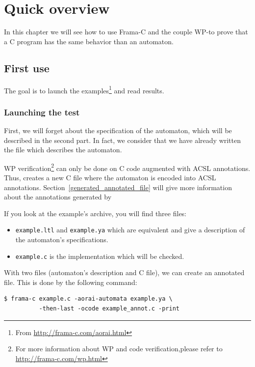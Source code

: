 \documentclass{report}
\begin{document}
\chapter{Quick overview}

In this chapter we will see how to use Frama-C and the couple
WP-\aorai to prove that a C program has the same behavior than
an automaton.

\section{First use}
\label{first_use}
  The goal is to launch the examples\footnote{ From \url{http://frama-c.com/aorai.html}} and read results.
\subsection{Launching the test}
  First, we will forget about the specification of the automaton,
  which will be described in the second part. In fact, we consider
  that we have already written the file which describes the automaton.

  WP verification\footnote{For more information about WP
    and code verification,please refer to
    \url{http://frama-c.com/wp.html}} can only be done on C
  code augmented with ACSL annotations. Thus, 
  \aorai creates a new C file where the automaton is encoded into ACSL 
  annotations. Section~\ref{generated_annotated_file} will give more
  information about the annotations generated by \aorai

  If you look at the example's archive, you will find three files:
\begin{itemize}
  \item \texttt{example.ltl} and \texttt{example.ya} which are equivalent and
    give a description of the automaton's specifications.
  \item \texttt{example.c} is the implementation which will be checked.
\end{itemize}

 With two files (automaton's description and C file), we can create an
annotated file. This
is done by the following command:
\begin{lstlisting}
$ frama-c example.c -aorai-automata example.ya \
          -then-last -ocode example_annot.c -print
\end{lstlisting} %
\end{document}

